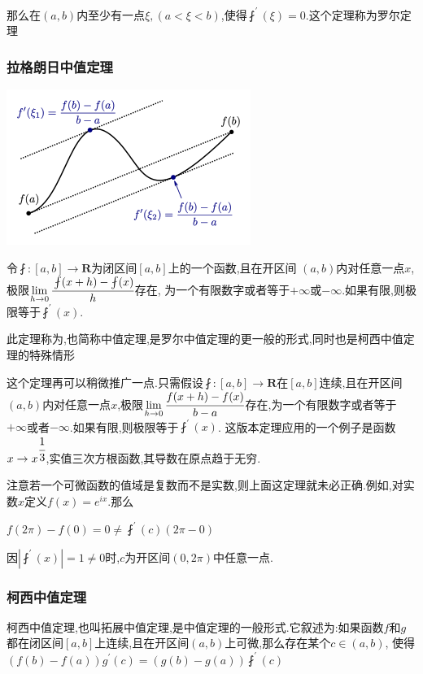 \documentclass[UTF8,12pt]{ctexbook}
\newcommand{\limNormal}[1]{\lim\limits_{#1}}
\newcommand{\derivative}{^\prime}
\newcommand{\fDerivative}[1]{\fint\derivative(#1)}
\newcommand{\defFunction}[1]{f(#1)}
\begin{document}
{{{{  那么在$(a,b)$内至少有一点$\xi, (a<\xi<b)$,使得$\fint\derivative(\xi) = 0$.这个定理称为罗尔定理
}%

\subsubsection{拉格朗日中值定理}{
\includegraphics{resources/Lagrange's_mean_value_theorem.png}

令$\fint : [a,b] \to \mathbf{R}$为闭区间$[a,b]$上的一个函数,且在开区间
$(a,b)$内对任意一点$x$,极限$\limNormal{h \to 0}\cfrac{\fint(x + h) - \fint(x)}{h}$存在,
为一个有限数字或者等于$+\infty$或$-\infty$.如果有限,则极限等于$\fDerivative{x}$.

此定理称为{},也简称中值定理,是罗尔中值定理的更一般的形式,同时也是柯西中值定理的特殊情形

这个定理再可以稍微推广一点.只需假设$\fint : [a,b] \to \mathbf{R}$在$[a,b]$连续,且在开区间$(a,b)$内对任意一点$x$,极限$\limNormal{h \to 0}
  \cfrac{\defFunction{x + h} - \defFunction{x}}{b - a}$存在,为一个有限数字或者等于$+\infty$或者$-\infty$.如果有限,则极限等于$\fDerivative{x}$.
这版本定理应用的一个例子是函数$x \to x^{\cfrac{1}{3}}$,实值三次方根函数,其导数在原点趋于无穷.

注意若一个可微函数的值域是复数而不是实数,则上面这定理就未必正确.例如,对实数$x$定义$\defFunction{x} = e^{ix}$.那么

$\defFunction{2\pi} - \defFunction{0} = 0 \neq \fDerivative{c}(2\pi - 0)$

因$|\fDerivative{x}| = 1 \neq 0$时,$c$为开区间$(0,2\pi)$中任意一点.
}%

\subsubsection{柯西中值定理}{
  柯西中值定理,也叫拓展中值定理,是中值定理的一般形式.它叙述为:如果函数$f$和$g$都在闭区间$[a,b]$上连续,且在开区间$(a,b)$上可微,那么存在某个$c \in (a,b)$,
  使得$(\defFunction{b} - \defFunction{a})g\derivative(c) = (g(b)-g(a))\fDerivative{c}$

}}}}
\end{document}
